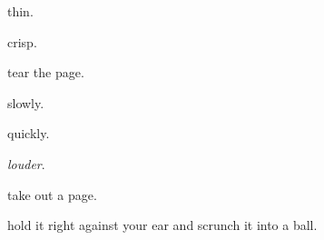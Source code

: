 \documentclass[extrafontsizes, 48pt]{memoir}
\newcommand\blankpage{%
    \null
    \thispagestyle{empty}%
    \addtocounter{page}{-1}%
    \newpage}
\begin{document}
	\begin{minipage}{.6\textwidth}
	thin.
	\end{minipage}
	\newpage

	\begin{minipage}{.6\textwidth}
	crisp.
	\afterpage{\blankpage}
	\end{minipage}
	\newpage

	\begin{minipage}{.6\textwidth}
	tear the page.
	\end{minipage}
	\newpage

	\begin{minipage}{.6\textwidth}
	slowly.
	\end{minipage}
	\newpage

	\begin{minipage}{.6\textwidth}
	quickly.
	\end{minipage}
	\newpage

	\begin{minipage}{.6\textwidth}
	\emph{louder}.
	\afterpage{\blankpage}
	\end{minipage}
	\newpage

	\begin{minipage}{.6\textwidth}
	take out a page.
	\end{minipage}
	\newpage

	\begin{minipage}{.6\textwidth}
	hold it right against your ear and scrunch it into a ball.
	\end{minipage}
	\newpage
\end{document}
